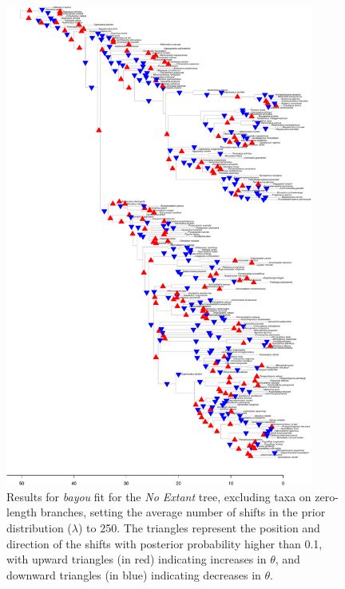 \begin{figure}[H]
\includegraphics[width=0.9\textwidth]{img/plots-noextant-k250-1.pdf}
\caption{Results for \textit{bayou} fit for the \textit{No Extant} tree, excluding taxa on zero-length branches, setting the average number of shifts in the prior distribution ($\lambda$) to 250. The triangles represent the position and direction of the shifts with posterior probability higher than 0.1, with upward triangles (in red) indicating increases in $\theta$, and downward triangles (in blue) indicating decreases in $\theta$.}
\label{fig:extant-k250-nzlb}
\end{figure}

\newpage

